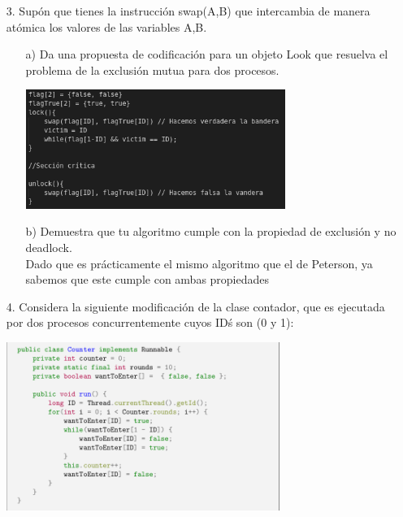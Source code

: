 \documentclass[12pt, letterpaper]{article}
\begin{document}
\begin{itemize}
\begin{itemize}
\end{itemize}


\item[3. ]Sup\'on que tienes la instrucci\'on swap(A,B) que intercambia de manera at\'omica los valores de las variables A,B.

\begin{itemize}
\item[a) ]Da una propuesta de codificaci\'on para un objeto Look que resuelva el problema de la exclusi\'on mutua para dos procesos.\\
\begin{center}
\includegraphics[width=0.7\textwidth]{lock.png}\\
\end{center}

\item[b) ]Demuestra que tu algoritmo cumple con la propiedad de exclusi\'on y no deadlock.\\
Dado que es prácticamente el mismo algoritmo que el de Peterson, ya sabemos que este cumple con ambas propiedades
\end{itemize}
\item[4. ] Considera la siguiente modificaci\'on de la clase contador, que es ejecutada por dos procesos concurrentemente cuyos ID\' s son (0 y 1):


\begin{center}
\includegraphics[width=0.7\textwidth]{CounterCode.png}\\
\end{center}



\end{itemize}
\end{document}
